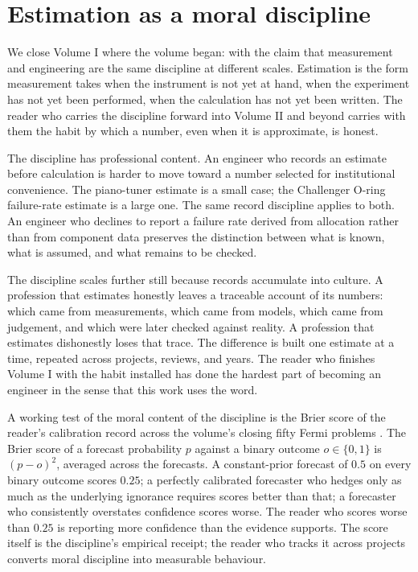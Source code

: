 \section{Estimation as a moral discipline}

We close Volume I where the volume began: with the claim that
measurement and engineering are the same discipline at different
scales. Estimation is the form measurement takes when the
instrument is not yet at hand, when the experiment has not yet
been performed, when the calculation has not yet been written.
The reader who carries the discipline forward into Volume II and
beyond carries with them the habit by which a number, even when
it is approximate, is honest.

The discipline has professional content. An engineer who records
an estimate before calculation is harder to move toward a number
selected for institutional convenience. The piano-tuner estimate
is a small case; the Challenger O-ring failure-rate estimate is a
large one. The same record discipline applies to both. An engineer
who declines to report a failure rate derived from allocation
rather than from component data preserves the distinction between
what is known, what is assumed, and what remains to be checked.

The discipline scales further still because records accumulate into
culture. A profession that estimates honestly leaves a traceable
account of its numbers: which came from measurements, which came
from models, which came from judgement, and which were later
checked against reality. A profession that estimates dishonestly
loses that trace. The difference is built one estimate at a time,
repeated across projects, reviews, and years. The reader who
finishes Volume I with the habit installed has done the hardest
part of becoming an engineer in the sense that this work uses the
word.

A working test of the moral content of the discipline is the
Brier score of the reader's calibration record across the volume's
closing fifty Fermi problems
\cite{paper:ch09-brier-1950,text:ch09-tetlock-superforecasting-2015}.
The Brier score of a forecast probability $p$ against a binary
outcome $o \in \{0,1\}$ is $(p - o)^{2}$, averaged across the
forecasts. A constant-prior forecast of $0.5$ on every binary
outcome scores $0.25$; a perfectly calibrated forecaster who
hedges only as much as the underlying ignorance requires scores
better than that; a forecaster who consistently overstates
confidence scores worse. The reader who scores worse than $0.25$
is reporting more confidence than the evidence supports. The
score itself is the discipline's empirical receipt; the reader
who tracks it across projects converts moral discipline into
measurable behaviour.

